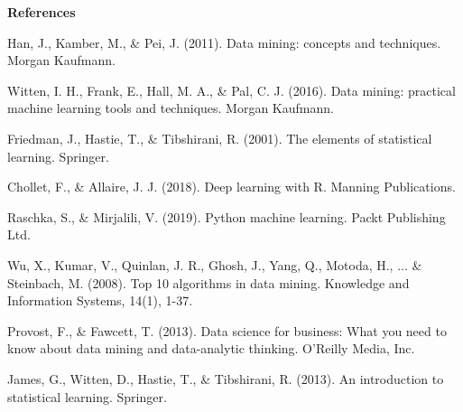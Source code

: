 \documentclass[]{article}
\newcommand{\textcenter}[1]{\begin{center} \vspace{10px}\textbf{\large #1} \end{center}}
\begin{document}
\textcenter{References}

Han, J., Kamber, M., \& Pei, J. (2011). Data mining: concepts and techniques. Morgan Kaufmann.

Witten, I. H., Frank, E., Hall, M. A., \& Pal, C. J. (2016). Data mining: practical machine learning tools and techniques. Morgan Kaufmann.

Friedman, J., Hastie, T., \& Tibshirani, R. (2001). The elements of statistical learning. Springer.

Chollet, F., \& Allaire, J. J. (2018). Deep learning with R. Manning Publications.

Raschka, S., \& Mirjalili, V. (2019). Python machine learning. Packt Publishing Ltd.

Wu, X., Kumar, V., Quinlan, J. R., Ghosh, J., Yang, Q., Motoda, H., ... \& Steinbach, M. (2008). Top 10 algorithms in data mining. Knowledge and Information Systems, 14(1), 1-37.

Provost, F., \& Fawcett, T. (2013). Data science for business: What you need to know about data mining and data-analytic thinking. O'Reilly Media, Inc.

James, G., Witten, D., Hastie, T., \& Tibshirani, R. (2013). An introduction to statistical learning. Springer.
\end{document}
